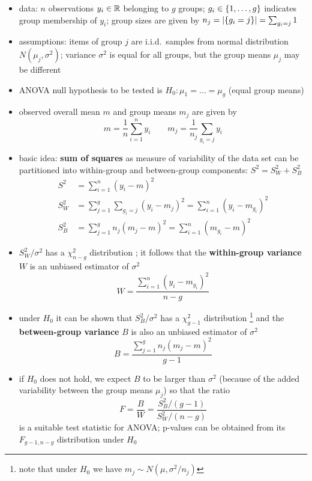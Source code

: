 \documentclass[a4paper]{article}
\begin{document}
\begin{itemize}
\item data: $n$ observations $y_i\in \mathbb{R}$ belonging to $g$ groups; $g_i\in \left\{1,\ldots,g\right\}$ indicates group membership of $y_i$; group sizes are given by $n_j = \left\lvert\left\{g_i = j\right\}\right\rvert = \sum_{g_i = j} 1$
\item assumptions: items of group $j$ are i.i.d.\ samples from normal distribution $N(\mu_j, \sigma^2)$; variance $\sigma^2$ is equal for all groups, but the group means $\mu_j$ may be different
\item ANOVA null hypothesis to be tested is $H_0: \mu_1 = \ldots = \mu_g$ (equal group means)
\item observed overall mean $m$ and group means $m_j$ are given by
  \begin{equation}
    \label{eq:lda:anova:means}
    m = \frac1n \sum_{i=1}^n y_i \qquad
    m_j = \frac1{n_j} \sum_{g_i = j} y_i
  \end{equation}
\item basic idea: \textbf{sum of squares} as measure of variability of the data set can be partitioned into within-group and between-group components: $S^2 = S^2_W + S^2_B$ \citep[758]{DeGroot:Schervish:12}
  \begin{align*}
    S^2 &= \sum_{i=1}^n (y_i - m)^2 \\
    S^2_W &= \sum_{j=1}^g \sum_{g_i = j} (y_i - m_j)^2 = \sum_{i=1}^n (y_i - m_{g_i})^2 \\
    S^2_B &= \sum_{j=1}^g n_j (m_j - m)^2 = \sum_{i=1}^n (m_{g_i} - m)^2
  \end{align*}
\item $S^2_W / \sigma^2$ has a $\chi^2_{n-g}$ distribution \citep[757]{DeGroot:Schervish:12}; it follows that the \textbf{within-group variance} $W$ is an unbiased estimator of $\sigma^2$
  \begin{equation}
    \label{eq:lda:anova:W}
    W = \frac{ \sum_{i=1}^n (y_i - m_{g_i})^2 }{ n - g }
  \end{equation}
\item under $H_0$ it can be shown that $S^2_B / \sigma^2$ has a $\chi^2_{g-1}$ distribution \citep[759]{DeGroot:Schervish:12}%
  \footnote{note that under $H_0$ we have $m_j \sim N(\mu, \sigma^2 / n_j)$} %
  and the \textbf{between-group variance} $B$ is also an unbiased estimator of $\sigma^2$
  \begin{equation}
    \label{eq:lda:anova:B}
    B = \frac{ \sum_{j=1}^g n_j (m_j - m)^2 }{ g - 1 }
  \end{equation}
\item if $H_0$ does not hold, we expect $B$ to be larger than $\sigma^2$ (because of the added variability between the group means $\mu_j$) so that the ratio
  \begin{equation}
    \label{eq:lda:anova:U}
    F = \frac{B}{W} = \frac{S^2_B / (g - 1)}{S^2_W / (n - g)}
  \end{equation}
  is a suitable test statistic for ANOVA; p-values can be obtained from its $F_{g-1, n-g}$ distribution under $H_0$ \citep[759]{DeGroot:Schervish:12}
\end{itemize}
\end{document}
